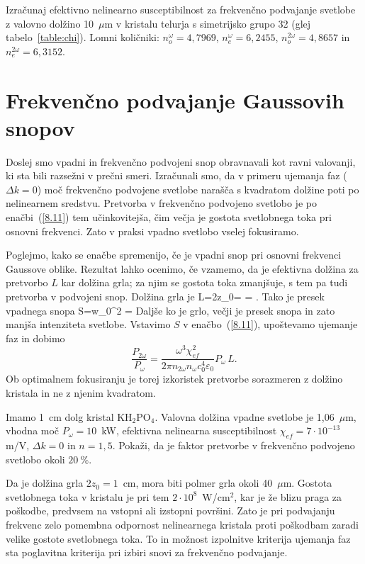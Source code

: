 \begin{definition}
Izračunaj efektivno nelinearno susceptibilnost za frekvenčno podvajanje svetlobe z valovno
dolžino 10~$\mu$m v kristalu telurja s simetrijsko grupo 32 (glej tabelo~\ref{table:chi}). 
Lomni količniki: $n_o^{\omega} = 4,7969$, 
$n_e^{\omega} = 6,2455$, $n_o^{2\omega} = 4,8657$ in $n_e^{2\omega} = 6,3152$.
\end{definition}

\section{Frekvenčno podvajanje Gaussovih snopov}

Doslej smo vpadni in frekvenčno podvojeni snop obravnavali kot ravni valovanji,
ki sta bili razsežni v prečni smeri. Izračunali smo, da v primeru ujemanja faz ($\Delta k=0$)
moč frekvenčno podvojene svetlobe narašča s kvadratom dolžine poti po nelinearnem
sredstvu. Pretvorba v frekvenčno podvojeno svetlobo je po enačbi~(\ref{8.11}) tem
učinkovitejša, čim večja je gostota svetlobnega toka pri osnovni frekvenci.
Zato v praksi vpadno svetlobo vselej fokusiramo.  

Poglejmo, kako se enačbe spremenijo, če je vpadni snop pri osnovni 
frekvenci Gaussove oblike. Rezultat lahko ocenimo, če vzamemo, da je
efektivna dolžina za pretvorbo $L$ kar dolžina grla; za njim se
gostota toka zmanjšuje, s tem pa tudi pretvorba v podvojeni snop.
Dolžina grla je 
\beq
L=2z_{0}= = .
\label{SHGG}
\eeq
Tako je presek vpadnega snopa
\beq
S=\pi w_{0}^{2} = 
\eeq
Daljše ko je grlo, večji je presek snopa in zato manjša intenziteta svetlobe. 
Vstavimo $S$ v enačbo~(\ref{8.11}), upoštevamo ujemanje faz in dobimo 
\begin{equation}
\frac{P_{2\omega}}{P_{\omega}}=
\frac{\omega^3 \chi_{ef}^2}{2 \pi n_{2\omega} n_\omega c_0^4\varepsilon_0} P_\omega\, L.
\label{8.17}
\end{equation}
Ob optimalnem fokusiranju je torej izkoristek pretvorbe sorazmeren z 
dolžino kristala in ne z njenim kvadratom.

\begin{definition}
Imamo 1~cm dolg kristal KH$_{2}$PO$_{4}$. Valovna dolžina vpadne svetlobe 
je 1,06~$\mu$m, vhodna moč $P_\omega = 10$~kW, efektivna nelinearna susceptibilnost
$\chi_{ef}=7\cdot10^{-13}~$m/V, $\Delta k=0$ in $n=1,5$. Pokaži, da je
faktor pretvorbe v frekvenčno podvojeno svetlobo okoli $20~\%$.

Da je dolžina grla $2z_{0}=1$~cm, mora biti polmer
grla okoli 40~$\mu$m. Gostota svetlobnega toka v kristalu je pri
tem $2\cdot10^{8}$~W/cm$^{2}$, kar je že blizu praga za poškodbe,
predvsem na vstopni ali izstopni površini. Zato je pri podvajanju frekvenc
zelo pomembna odpornost nelinearnega kristala proti poškodbam
zaradi velike gostote svetlobnega toka. To in možnost izpolnitve kriterija ujemanja 
faz sta poglavitna kriterija pri izbiri snovi za frekvenčno podvajanje. 
\end{definition}

